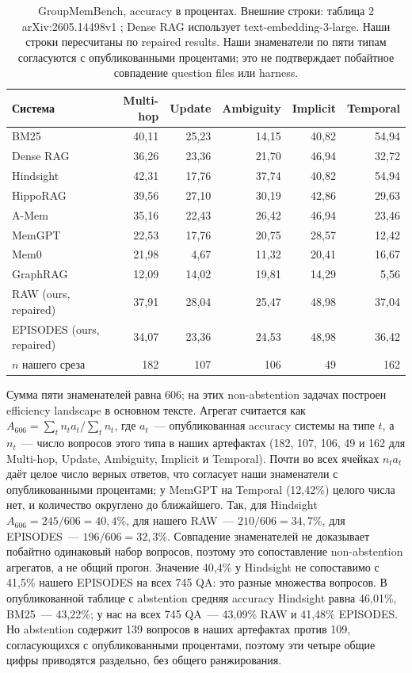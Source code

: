 \documentclass[11pt,a4paper]{article}
\newcommand{\raw}{RAW}
\newcommand{\episodes}{EPISODES}
\begin{document}
\begin{table}[ht]
\centering\small
\begin{tabular}{@{}lrrrrr@{}}
\toprule
Система & Multi-hop & Update & Ambiguity & Implicit & Temporal\\
\midrule
BM25 & 40{,}11 & 25{,}23 & 14{,}15 & 40{,}82 & 54{,}94\\
Dense RAG & 36{,}26 & 23{,}36 & 21{,}70 & 46{,}94 & 32{,}72\\
Hindsight & 42{,}31 & 17{,}76 & 37{,}74 & 40{,}82 & 54{,}94\\
HippoRAG & 39{,}56 & 27{,}10 & 30{,}19 & 42{,}86 & 29{,}63\\
A-Mem & 35{,}16 & 22{,}43 & 26{,}42 & 46{,}94 & 23{,}46\\
MemGPT & 22{,}53 & 17{,}76 & 20{,}75 & 28{,}57 & 12{,}42\\
Mem0 & 21{,}98 & 4{,}67 & 11{,}32 & 20{,}41 & 16{,}67\\
GraphRAG & 12{,}09 & 14{,}02 & 19{,}81 & 14{,}29 & 5{,}56\\
\midrule
\raw{} (ours, repaired) & 37{,}91 & 28{,}04 & 25{,}47 & 48{,}98 & 37{,}04\\
\episodes{} (ours, repaired) & 34{,}07 & 23{,}36 & 24{,}53 & 48{,}98 & 36{,}42\\
$n$ нашего среза & 182 & 107 & 106 & 49 & 162\\
\bottomrule
\end{tabular}
\caption{GroupMemBench, accuracy в процентах. Внешние строки: таблица 2
arXiv:2605.14498v1 \citep{yang2026}; Dense RAG использует
text-embedding-3-large. Наши строки пересчитаны по repaired results.
Наши знаменатели по пяти типам согласуются с опубликованными процентами;
это не подтверждает побайтное совпадение question files или harness.}
\label{tab:group-external}
\end{table}

Сумма пяти знаменателей равна 606; на этих non-abstention задачах построен
efficiency landscape в основном тексте. Агрегат считается как
$A_{606}=\sum_t n_t a_t\big/\sum_t n_t$, где $a_t$~--- опубликованная accuracy
системы на типе $t$, а $n_t$~--- число вопросов этого типа в наших артефактах
(182, 107, 106, 49 и 162 для Multi-hop, Update, Ambiguity, Implicit и Temporal).
Почти во всех ячейках $n_t a_t$ даёт целое число верных ответов, что согласует
наши знаменатели с опубликованными процентами; у MemGPT на Temporal (12,42\%)
целого числа нет, и количество округлено до ближайшего. Так, для Hindsight
$A_{606}=245/606=40{,}4\%$, для нашего RAW~--- $210/606=34{,}7\%$, для
EPISODES~--- $196/606=32{,}3\%$. Совпадение знаменателей не доказывает
побайтно одинаковый набор вопросов, поэтому это сопоставление non-abstention
агрегатов, а не общий прогон. Значение 40{,}4\% у Hindsight не сопоставимо с
41{,}5\% нашего EPISODES на всех 745 QA: это разные множества вопросов. В опубликованной таблице с abstention средняя accuracy
Hindsight равна 46{,}01\%, BM25~--- 43{,}22\%; у нас на всех 745 QA~---
43{,}09\% RAW и 41{,}48\% EPISODES. Но abstention содержит 139 вопросов
в наших артефактах против 109, согласующихся с опубликованными процентами,
поэтому эти четыре
общие цифры приводятся раздельно, без общего ранжирования.
\end{document}
